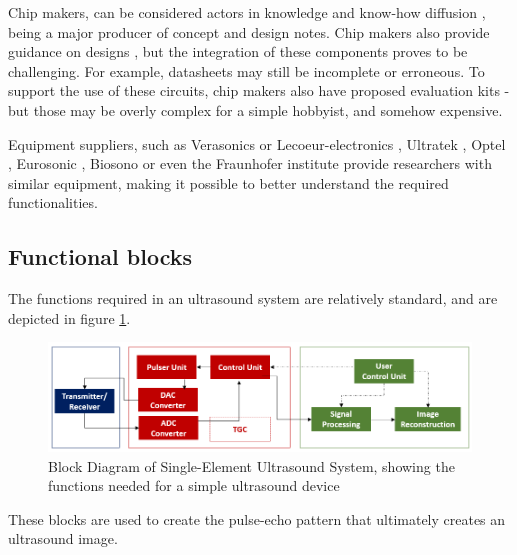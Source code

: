 \documentclass{article}
\begin{document}
Chip makers, can be considered actors in knowledge and know-how diffusion \cite{brunner_how_2002,xu_challenges_2010}, being a major producer of concept and design notes. Chip makers also provide guidance on designs \cite{ching_chu_designing_nodate}, but the integration of these components proves to be challenging. For example, datasheets may still be incomplete or erroneous. To support the use of these circuits, chip makers also have proposed evaluation kits - but those may be overly complex for a simple hobbyist, and somehow expensive.

Equipment suppliers, such as Verasonics \cite{peyton_front-end_2017,wall_high-speed_2010,george_portable_2018,hager_lightprobe:_2019,pashaei_flexible_2020,kang_new_2017,boni_ultrasound_2018,wang_high-resolution_2019,hager_ultralight:_2017,peyton_comparison_2018,assef_initial_2016} or Lecoeur-electronics \cite{lecoeur_bluetooth_nodate,tortoli_ula-op:_2009,zhang_toward_2018,al-aufi_thin_2019}, Ultratek \cite{veenstra_generating_nodate,perez-sanchez_numerical_2020,chen_ultrasound_2016,wang_preliminary_2019}, Optel \cite{veenstra_generating_nodate,scholle_pulse_2018,ratajski_application_2017,nowak_evaluation_2020}, Eurosonic \cite{vadalma_smartphone_2020}, Biosono \cite{biosono_sonolab_nodate} or even the Fraunhofer institute \cite{zimmermann_highly_2019,zimmermann_miniaturized_2018,zimmermann_high_2018} provide researchers with similar equipment, making it possible to better understand the required functionalities.

\subsection{Functional blocks}

The functions required in an ultrasound system are relatively standard, and  are depicted in figure \ref{fig:BlockDiagramme}.

\begin{figure}[H]
 \includegraphics[width=\linewidth]{images/Blockdiagramme.PNG}
 \caption{Block Diagram of Single-Element Ultrasound System, showing the functions needed for a simple ultrasound device}
 \label{fig:BlockDiagramme}
\end{figure}
These blocks are used to create the pulse-echo pattern that ultimately creates an ultrasound image.
\end{document}
